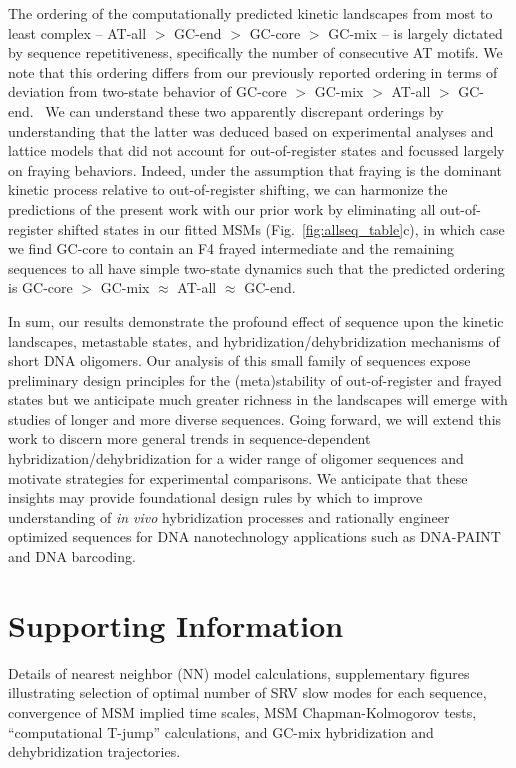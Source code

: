 \documentclass[journal=jpcbfk,manuscript=article]{achemso}
\begin{document}
The ordering of the computationally predicted kinetic landscapes from most to least complex -- AT-all $>$ GC-end $>$ GC-core $>$ GC-mix -- is largely dictated by sequence repetitiveness, specifically the number of consecutive AT motifs. We note that this ordering differs from our previously reported ordering in terms of deviation from two-state behavior of GC-core $>$ GC-mix $>$ AT-all $>$ GC-end.~\citep{Sanstead2016, Sanstead2018DirectDehybridization} We can understand these two apparently discrepant orderings by understanding that the latter was deduced based on experimental analyses and lattice models that did not account for out-of-register states and focussed largely on fraying behaviors. Indeed, under the assumption that fraying is the dominant kinetic process relative to out-of-register shifting, we  can harmonize the predictions of the present work with our prior work by eliminating all out-of-register shifted states in our fitted MSMs (Fig.~\ref{fig:allseq_table}c), in which case we find GC-core to contain an F4 frayed intermediate and the remaining sequences to all have simple two-state dynamics such that the predicted ordering is GC-core $>$ GC-mix $\approx$ AT-all $\approx$ GC-end.

In sum, our results demonstrate the profound effect of sequence upon the kinetic landscapes, metastable states, and hybridization/dehybridization mechanisms of short DNA oligomers. Our analysis of this small family of sequences expose preliminary design principles for the (meta)stability of out-of-register and frayed states but we anticipate much greater richness in the landscapes will emerge with studies of longer and more diverse sequences. Going forward, we will extend this work to discern more general trends in sequence-dependent hybridization/dehybridization for a wider range of oligomer sequences and motivate strategies for experimental comparisons. We anticipate that these insights may provide foundational design rules by which to improve understanding of \emph{in vivo} hybridization processes and rationally engineer optimized sequences for DNA nanotechnology applications such as DNA-PAINT~\citep{Strauss2020UpDNA-PAINT} and DNA barcoding.~\citep{Shah2019} 




\section*{Supporting Information}

Details of nearest neighbor (NN) model calculations, supplementary figures illustrating selection of optimal number of SRV slow modes for each sequence, convergence of MSM implied time scales, MSM Chapman-Kolmogorov tests, ``computational T-jump'' calculations, and GC-mix hybridization and dehybridization trajectories. 
\end{document}
